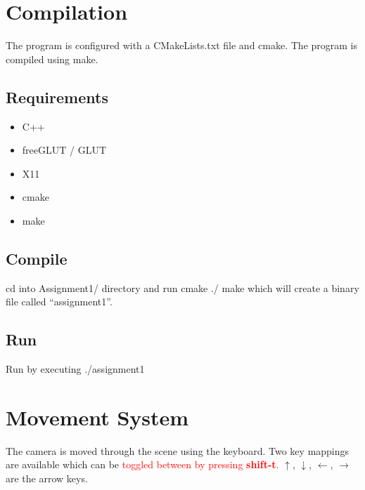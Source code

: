 \documentclass[10pt, oneside]{article}   	%
\begin{document}

\section{Compilation}
The program is configured with a CMakeLists.txt file and cmake.  The program is compiled using make.

\subsection{Requirements}
\begin{itemize}
\item C++
\item freeGLUT / GLUT
\item X11
\item cmake
\item make
\end{itemize}

\subsection{Compile}
cd into Assignment1/ directory and run
\newline \newline
{\small {}\selectfont
cmake ./
\newline
make
}
\newline \newline
which will create a binary file called ``assignment1''.

\subsection{Run}
Run by executing
\newline \newline
{\small {}\selectfont
./assignment1
}



\section{Movement System}
The camera is moved through the scene using the keyboard.  Two key mappings are available which can be \textcolor{red}{toggled between by pressing \textbf{shift-t}.}  $\uparrow$, $\downarrow$, $\leftarrow$, $\rightarrow$ are the arrow keys.
\newline
\end{document}
